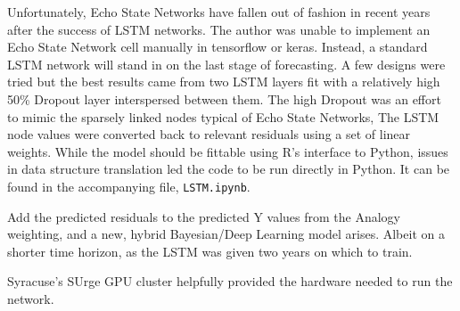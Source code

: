 \documentclass[]{article}
\newenvironment{Shaded}{\begin{snugshade}}{\end{snugshade}}
\newcommand{\KeywordTok}[1]{\textcolor[rgb]{0.13,0.29,0.53}{\textbf{#1}}}
\newcommand{\DataTypeTok}[1]{\textcolor[rgb]{0.13,0.29,0.53}{#1}}
\newcommand{\DecValTok}[1]{\textcolor[rgb]{0.00,0.00,0.81}{#1}}
\newcommand{\StringTok}[1]{\textcolor[rgb]{0.31,0.60,0.02}{#1}}
\newcommand{\OperatorTok}[1]{\textcolor[rgb]{0.81,0.36,0.00}{\textbf{#1}}}
\newcommand{\NormalTok}[1]{#1}
\begin{document}
Unfortunately, Echo State Networks have fallen out of fashion in recent
years after the success of LSTM networks. The author was unable to
implement an Echo State Network cell manually in tensorflow or keras.
Instead, a standard LSTM network will stand in on the last stage of
forecasting. A few designs were tried but the best results came from two
LSTM layers fit with a relatively high 50\% Dropout layer interspersed
between them. The high Dropout was an effort to mimic the sparsely
linked nodes typical of Echo State Networks, The LSTM node values were
converted back to relevant residuals using a set of linear weights.
While the model should be fittable using R's interface to Python, issues
in data structure translation led the code to be run directly in Python.
It can be found in the accompanying file, \texttt{LSTM.ipynb}.

Add the predicted residuals to the predicted Y values from the Analogy
weighting, and a new, hybrid Bayesian/Deep Learning model arises. Albeit
on a shorter time horizon, as the LSTM was given two years on which to
train.

Syracuse's SUrge GPU cluster helpfully provided the hardware needed to
run the network.

\begin{Shaded}
\end{Shaded}
\end{document}
